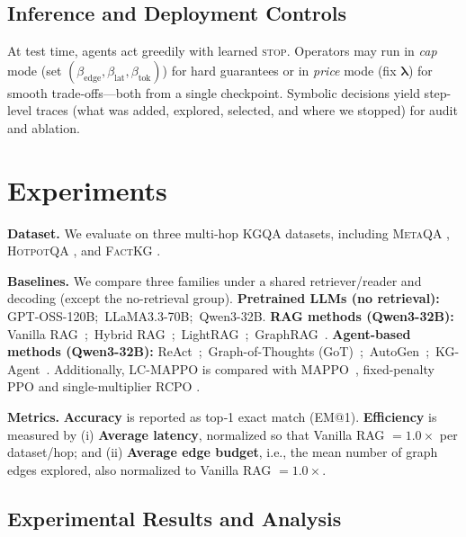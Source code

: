 \documentclass{article} %
\newcommand{\lagvec}{\boldsymbol{\lambda}}       %
\begin{document}
\subsection{Inference and Deployment Controls}
\label{sec:inference}
At test time, agents act greedily with learned \textsc{stop}. Operators may run in \emph{cap} mode (set $(\beta_{\mathrm{edge}},\beta_{\mathrm{lat}},\beta_{\mathrm{tok}})$) for hard guarantees or in \emph{price} mode (fix $\lagvec$) for smooth trade-offs—both from a single checkpoint. Symbolic decisions yield step-level traces (what was added, explored, selected, and where we stopped) for audit and ablation.





\section{Experiments}
\label{sec:experiments}

\textbf{Dataset.} We evaluate on three multi‑hop KGQA datasets, including \textsc{MetaQA} \citep{zhang2017variational}, \textsc{HotpotQA} \citep{yang2018hotpotqa}, and \textsc{FactKG} \citep{kim2023factkg}.


\textbf{Baselines.} We compare three families under a shared retriever/reader and decoding (except the no-retrieval group). \textbf{Pretrained LLMs (no retrieval):} GPT-OSS-120B;\ LLaMA3.3-70B;\ Qwen3-32B. \textbf{RAG methods (Qwen3-32B):} Vanilla RAG~\citep{lewis2020rag};\ Hybrid RAG~\citep{robertson2009bm25,karpukhin2020dense,nogueira2019passage};\ LightRAG~\citep{guo-etal-2025-lightrag};\ GraphRAG~\citep{edge2024graphrag}. \textbf{Agent-based methods (Qwen3-32B):} ReAct~\citep{yao2023react};\ Graph-of-Thoughts (GoT)~\citep{besta2023graphofthoughts};\ AutoGen~\citep{wu2023autogen};\ KG-Agent~\citep{jiang2024kg}. Additionally, LC-MAPPO is compared with MAPPO~\citep{yu2022surprising}, fixed-penalty PPO \citep{schulman2017ppo} and single-multiplier RCPO \citep{tessler2018reward}.


\textbf{Metrics.}
\textbf{Accuracy} is reported as top‑1 exact match (EM@1). \textbf{Efficiency} is measured by (i) \textbf{Average latency}, normalized so that Vanilla RAG $=1.0\times$ per dataset/hop; and (ii) \textbf{Average edge budget}, i.e., the mean number of graph edges explored, also normalized to Vanilla RAG $=1.0\times$.


\subsection{Experimental Results and Analysis}
\label{sec:main_results}
\end{document}
